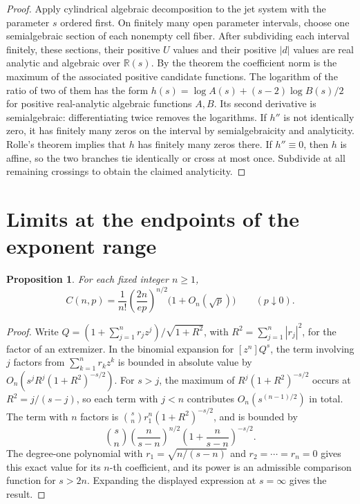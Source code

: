 \documentclass[11pt]{article}
\newtheorem{proposition}[theorem]{Proposition}
\newcommand{\coef}[1]{[z^{#1}]}
\begin{document}
\begin{proof}
Apply cylindrical algebraic decomposition to the jet system with
the parameter \(s\) ordered first. On finitely many open parameter
intervals, choose one semialgebraic section of each nonempty cell
fiber. After subdividing each interval finitely, these sections,
their positive \(U\) values and their positive \(|d|\) values
are real analytic and algebraic over \(\mathbb R(s)\).
By the theorem the coefficient norm is the maximum of the associated
positive candidate functions. The logarithm of the ratio of two
of them has the form
\(h(s)=\log A(s)+(s-2)\log B(s)/2\)
for positive real-analytic algebraic functions \(A,B\).
Its second derivative is semialgebraic: differentiating twice
removes the logarithms. If \(h''\) is not identically zero, it
has finitely many zeros on the interval by semialgebraicity and
analyticity. Rolle's theorem implies that \(h\) has finitely many
zeros there. If \(h''\equiv0\), then \(h\) is affine, so the two
branches tie identically or cross at most once. Subdivide at all
remaining crossings to obtain the claimed analyticity.
\end{proof}
\section{Limits at the endpoints of the exponent range}

\begin{proposition}\label{prop:smallp}
For each fixed integer \(n\ge1\),
\[
 C(n,p)=\frac{1}{n!}\left(\frac{2n}{ep}\right)^{n/2}
            \bigl(1+O_n(\sqrt p)\bigr)
 \qquad(p\downarrow0).
\]
\end{proposition}

\begin{proof}
Write \(Q= (1+\sum_{j=1}^n r_jz^j)/\sqrt{1+R^2}\), with
\(R^2=\sum_{j=1}^n |r_j|^2\), for the factor of an extremizer.
In the binomial expansion for \(\coef n Q^s\), the term involving
\(j\) factors from \(\sum_{k=1}^n r_kz^k\) is bounded in absolute
value by \(O_n(s^j R^j (1+R^2)^{-s/2})\).
For \(s>j\), the maximum of \(R^j(1+R^2)^{-s/2}\) occurs at
\(R^2=j/(s-j)\), so each term with \(j<n\) contributes
\(O_n(s^{(n-1)/2})\) in total. The term with \(n\) factors is
\(\binom sn r_1^n(1+R^2)^{-s/2}\), and is bounded by
\[
 \binom sn\left(\frac{n}{s-n}\right)^{n/2}
     \left(1+\frac{n}{s-n}\right)^{-s/2}.
\]
The degree-one polynomial with \(r_1=\sqrt{n/(s-n)}\) and
\(r_2=\cdots=r_n=0\) gives this exact value for its \(n\)-th
coefficient, and its power is an admissible comparison function
for \(s>2n\). Expanding the displayed expression at \(s=\infty\)
gives the result.
\end{proof}
\end{document}
